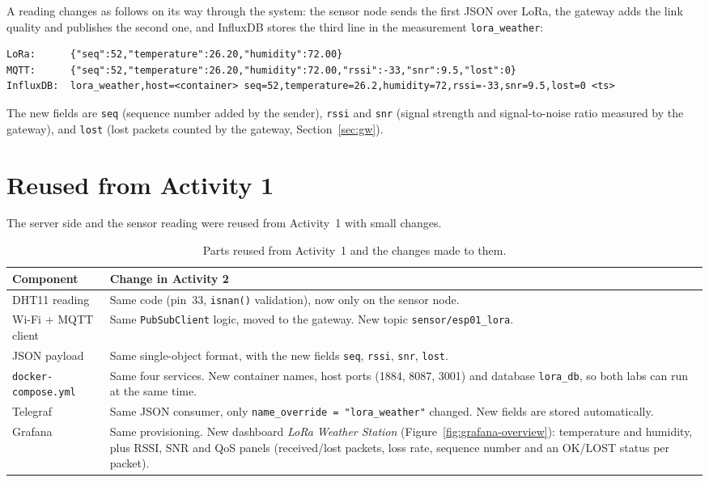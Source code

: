 \documentclass[11pt,a4paper]{article}
\begin{document}
A reading changes as follows on its way through the system: the sensor node sends the first
JSON over LoRa, the gateway adds the link quality and publishes the second one, and InfluxDB
stores the third line in the measurement \texttt{lora\_weather}:

\begin{lstlisting}
LoRa:      {"seq":52,"temperature":26.20,"humidity":72.00}
MQTT:      {"seq":52,"temperature":26.20,"humidity":72.00,"rssi":-33,"snr":9.5,"lost":0}
InfluxDB:  lora_weather,host=<container> seq=52,temperature=26.2,humidity=72,rssi=-33,snr=9.5,lost=0 <ts>
\end{lstlisting}

The new fields are \texttt{seq} (sequence number added by the sender), \texttt{rssi} and
\texttt{snr} (signal strength and signal-to-noise ratio measured by the gateway), and
\texttt{lost} (lost packets counted by the gateway, Section~\ref{sec:gw}).

\section{Reused from Activity 1}
\label{sec:reuse}

The server side and the sensor reading were reused from Activity~1 with small changes.

\begin{table}[H]
\centering
\small
\begin{tabular}{p{3.3cm}p{13.3cm}}
\toprule
\textbf{Component} & \textbf{Change in Activity 2} \\
\midrule
DHT11 reading & Same code (pin~33, \texttt{isnan()} validation), now only on the sensor node. \\
Wi-Fi + MQTT client & Same \texttt{PubSubClient} logic, moved to the gateway. New topic \texttt{sensor/esp01\_lora}. \\
JSON payload & Same single-object format, with the new fields \texttt{seq}, \texttt{rssi}, \texttt{snr}, \texttt{lost}. \\
\texttt{docker-compose.yml} & Same four services. New container names, host ports (1884, 8087, 3001) and database \texttt{lora\_db}, so both labs can run at the same time. \\
Telegraf & Same JSON consumer, only \texttt{name\_override = "lora\_weather"} changed. New fields are stored automatically. \\
Grafana & Same provisioning. New dashboard \emph{LoRa Weather Station} (Figure~\ref{fig:grafana-overview}): temperature and humidity, plus RSSI, SNR and QoS panels (received/lost packets, loss rate, sequence number and an OK/LOST status per packet). \\
\bottomrule
\end{tabular}
\caption{Parts reused from Activity~1 and the changes made to them.}
\label{tab:reuse}
\end{table}
\end{document}
